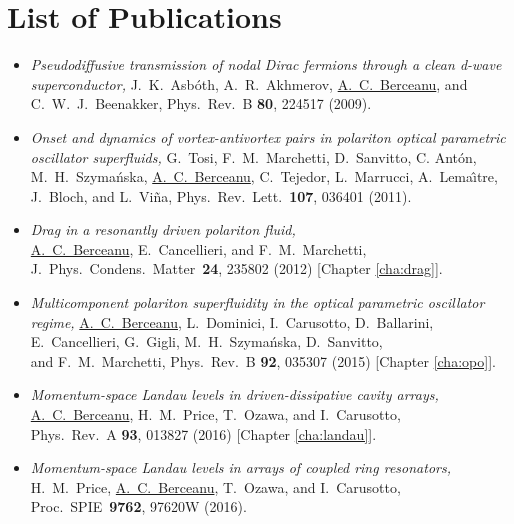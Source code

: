 \chapter*{List of Publications}

\begin{itemize}

\item

  \emph{Pseudodiffusive transmission of nodal Dirac fermions through a clean d-wave superconductor,}
   J.~K.~Asb\'{o}th, A.~R.~Akhmerov, \underline{A.~C.~Berceanu}, and C.~W.~J.~Beenakker,
   Phys.\ Rev.\ B \textbf{80}, 224517 (2009).

\item

  \emph{Onset and dynamics of vortex-antivortex pairs in polariton optical parametric oscillator superfluids,}
  G.~Tosi, F.~M.~Marchetti, D.~Sanvitto, C. Ant\'{o}n, M.~H.~Szyma\'{n}ska, \underline{A.~C.~Berceanu}, C.~Tejedor, L.~Marrucci, A.~Lema\^{\i}tre, J.~Bloch, and L.~Vi\~{n}a,
  Phys.\ Rev.\ Lett.\ \textbf{107}, 036401 (2011).

\item

  \emph{Drag in a resonantly driven polariton fluid,}\\
  \underline{A.~C.~Berceanu}, E.~Cancellieri, and F.~M.~Marchetti,\\
  J.\ Phys.\ Condens.\ Matter\ \textbf{24}, 235802 (2012) [Chapter \ref{cha:drag}].

\item

  \emph{Multicomponent polariton superfluidity in the optical parametric oscillator regime,}
  \underline{A.~C.~Berceanu}, L.~Dominici, I.~Carusotto, D.~Ballarini,\\
  E.~Cancellieri, G.~Gigli, M.~H.~Szyma\'{n}ska, D.~Sanvitto,\\ and F.~M.~Marchetti,
  Phys.\ Rev.\ B \textbf{92}, 035307 (2015) [Chapter \ref{cha:opo}].

\item

  \emph{Momentum-space Landau levels in driven-dissipative cavity arrays,}\\
  \underline{A.~C.~Berceanu}, H.~M.~Price, T.~Ozawa, and I.~Carusotto,\\
  Phys.\ Rev.\ A \textbf{93}, 013827 (2016) [Chapter \ref{cha:landau}].

\item

  \emph{Momentum-space Landau levels in arrays of coupled ring resonators,}\\
  H.~M.~Price, \underline{A.~C.~Berceanu}, T.~Ozawa, and I.~Carusotto,\\
  Proc.\ SPIE\ \textbf{9762}, 97620W (2016).


\end{itemize}


